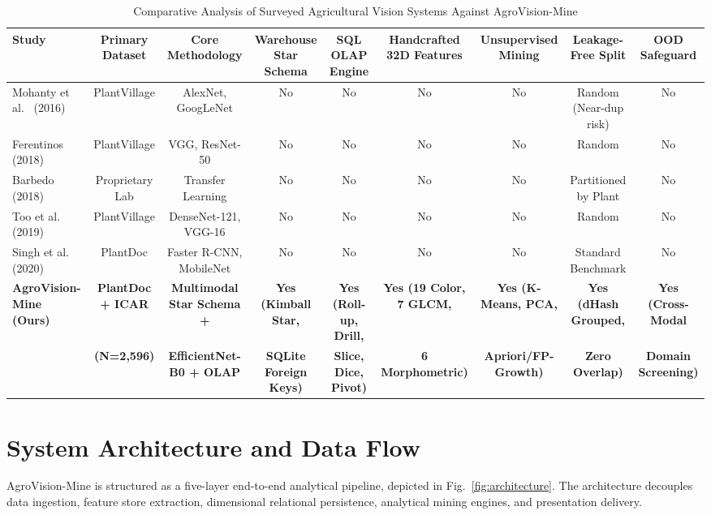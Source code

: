 \documentclass[conference,a4paper]{IEEEtran}
\begin{document}
\begin{table}[t]
\caption{Comparative Analysis of Surveyed Agricultural Vision Systems Against AgroVision-Mine}
\label{tab:literature_comparison}
\centering
\scriptsize
\begin{tabularx}{\textwidth}{lcccccccc}
\toprule
\textbf{Study} & \textbf{Primary Dataset} & \textbf{Core Methodology} & \textbf{Warehouse Star Schema} & \textbf{SQL OLAP Engine} & \textbf{Handcrafted 32D Features} & \textbf{Unsupervised Mining} & \textbf{Leakage-Free Split} & \textbf{OOD Safeguard} \\
\midrule
Mohanty et al.~\cite{mohanty2016deep} (2016) & PlantVillage & AlexNet, GoogLeNet & No & No & No & No & Random (Near-dup risk) & No \\
Ferentinos~\cite{ferentinos2018deep} (2018) & PlantVillage & VGG, ResNet-50 & No & No & No & No & Random & No \\
Barbedo~\cite{barbedo2018impact} (2018) & Proprietary Lab & Transfer Learning & No & No & No & No & Partitioned by Plant & No \\
Too et al.~\cite{too2019comparative} (2019) & PlantVillage & DenseNet-121, VGG-16 & No & No & No & No & Random & No \\
Singh et al.~\cite{singh2020plantdoc} (2020) & PlantDoc & Faster R-CNN, MobileNet & No & No & No & No & Standard Benchmark & No \\
\textbf{AgroVision-Mine (Ours)} & \textbf{PlantDoc + ICAR} & \textbf{Multimodal Star Schema +} & \textbf{Yes (Kimball Star,} & \textbf{Yes (Roll-up, Drill,} & \textbf{Yes (19 Color, 7 GLCM,} & \textbf{Yes (K-Means, PCA,} & \textbf{Yes (dHash Grouped,} & \textbf{Yes (Cross-Modal} \\
& \textbf{(N=2,596)} & \textbf{EfficientNet-B0 + OLAP} & \textbf{SQLite Foreign Keys)} & \textbf{Slice, Dice, Pivot)} & \textbf{6 Morphometric)} & \textbf{Apriori/FP-Growth)} & \textbf{Zero Overlap)} & \textbf{Domain Screening)} \\
\bottomrule
\end{tabularx}
\end{table}

\section{System Architecture and Data Flow}
AgroVision-Mine is structured as a five-layer end-to-end analytical pipeline, depicted in Fig.~\ref{fig:architecture}. The architecture decouples data ingestion, feature store extraction, dimensional relational persistence, analytical mining engines, and presentation delivery.
\end{document}
